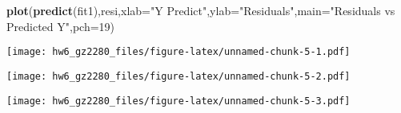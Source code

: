 \documentclass[]{article}
\newenvironment{Shaded}{\begin{snugshade}}{\end{snugshade}}
\newcommand{\DataTypeTok}[1]{\textcolor[rgb]{0.13,0.29,0.53}{#1}}
\newcommand{\DecValTok}[1]{\textcolor[rgb]{0.00,0.00,0.81}{#1}}
\newcommand{\KeywordTok}[1]{\textcolor[rgb]{0.13,0.29,0.53}{\textbf{#1}}}
\newcommand{\NormalTok}[1]{#1}
\newcommand{\OperatorTok}[1]{\textcolor[rgb]{0.81,0.36,0.00}{\textbf{#1}}}
\newcommand{\StringTok}[1]{\textcolor[rgb]{0.31,0.60,0.02}{#1}}
\begin{document}
\begin{Shaded}
\begin{Highlighting}[]
\KeywordTok{plot}\NormalTok{(}\KeywordTok{predict}\NormalTok{(fit1),resi,}\DataTypeTok{xlab=}\StringTok{"Y Predict"}\NormalTok{,}\DataTypeTok{ylab=}\StringTok{"Residuals"}\NormalTok{,}\DataTypeTok{main=}\StringTok{"Residuals vs Predicted Y"}\NormalTok{,}\DataTypeTok{pch=}\DecValTok{19}\NormalTok{)}
\end{Highlighting}
\end{Shaded}

\texttt{[image: hw6\_gz2280\_files/figure-latex/unnamed-chunk-5-1.pdf]}

\begin{Shaded}
\end{Shaded}

\texttt{[image: hw6\_gz2280\_files/figure-latex/unnamed-chunk-5-2.pdf]}

\begin{Shaded}
\end{Shaded}

\texttt{[image: hw6\_gz2280\_files/figure-latex/unnamed-chunk-5-3.pdf]}

\begin{Shaded}
\end{Shaded}
\end{document}
